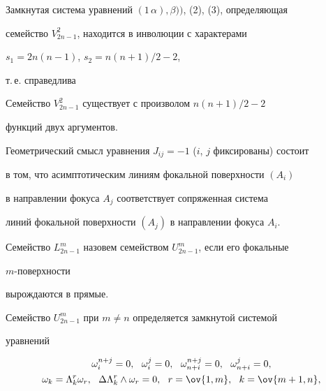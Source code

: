  


Замкнутая система уравнений $(1\,\alpha), \beta))$, (2), (3), определяющая 


семейство $V^2_{2n-1}$, находится в инволюции с характерами 


$s_1=2n(n-1)$, $s_2=n(n+1)/2-2$, 


т.\,е. справедлива 


 


\begin{thm} 


Семейство $V^2_{2n-1}$ существует с произволом $n(n+1)/2-2$ 


функций двух аргументов. 


\end{thm} 


 


Геометрический смысл уравнения $J_{i j}=-1$ ($i$, $j$ фиксированы) состоит 


в том, что асимптотическим линиям фокальной поверхности $(A_i)$ 


в направлении фокуса $A_j$ соответствует сопряженная система 


линий фокальной поверхности $(A_j)$ в направлении фокуса $A_i$. 


 


\begin{defn} 


Семейство $L^m_{2n-1}$ назовем семейством $U^m_{2n-1}$, если его фокальные 


$m$-по\-верх\-нос\-ти 


вырождаются в прямые. 


\end{defn} 


 


Семейство $U^m_{2n-1}$ при $m\ne n$ определяется замкнутой системой 


уравнений 


\begin{gather} 


\omega^{n+j}_i=0,\ \ \omega^j_i=0, 


\ \ \omega^{n+j}_{n+i}=0,\ \ \omega^j_{n+i}=0, \\ 


% 


\omega_k=\Lambda^r_k\omega_r,\ \ \Delta\Lambda^r_k\wedge\omega_r=0, 


\ \ r=\ov{1,m},\ \ k=\ov{m+1,n}, 


\end{gather} 


